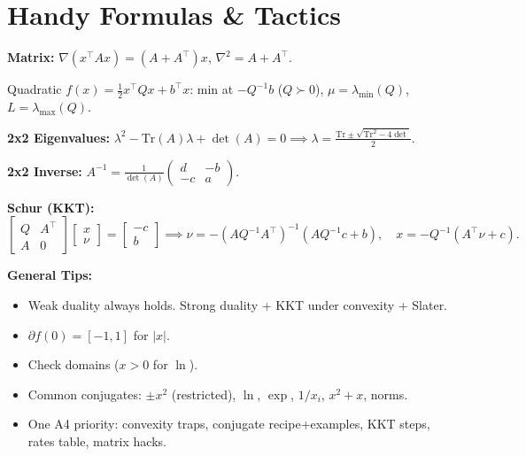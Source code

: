 \section*{Handy Formulas \& Tactics}
\textbf{Matrix:}
\(\nabla(x^\top Ax)=(A+A^\top)x\), \(\nabla^2=A+A^\top\).

Quadratic \(f(x)=\frac12 x^\top Qx + b^\top x\): min at \(-Q^{-1}b\)
(\(Q\succ0\)), \(\mu=\lambda_\mathrm{min}(Q)\),
\(L=\lambda_\mathrm{max}(Q)\).

\textbf{2x2 Eigenvalues:}
\(\lambda^2-\mathrm{Tr}(A)\lambda+\det(A)=0\implies\lambda=\frac{\mathrm{Tr}\pm\sqrt{\mathrm{Tr}^2-4\det}}{2}\).

\textbf{2x2 Inverse:} \(A^{-1}=\frac1{\det(A)}
  \begin{pmatrix}d&-b\\-c&a
\end{pmatrix}\).

\textbf{Schur (KKT):}
\[
  \begin{bmatrix}Q&A^\top\\A&0
  \end{bmatrix}
  \begin{bmatrix}x\\\nu
  \end{bmatrix}=
  \begin{bmatrix}-c\\b
  \end{bmatrix}
  \implies\nu=-(AQ^{-1}A^\top)^{-1}(AQ^{-1}c+b),\quad
  x=-Q^{-1}(A^\top\nu+c).
\]

\textbf{General Tips:}
\begin{itemize}[leftmargin=*,itemsep=-1pt]
  \item Weak duality always holds. Strong duality + KKT under
    convexity + Slater.
  \item \(\partial f(0)=[-1,1]\) for \(|x|\).
  \item Check domains (\(x>0\) for \(\ln\)).
  \item Common conjugates: \(\pm x^2\) (restricted), \(\ln\),
    \(\exp\), \(1/x_i\), \(x^2+x\), norms.
  \item One A4 priority: convexity traps, conjugate recipe+examples,
    KKT steps, rates table, matrix hacks.
\end{itemize}
